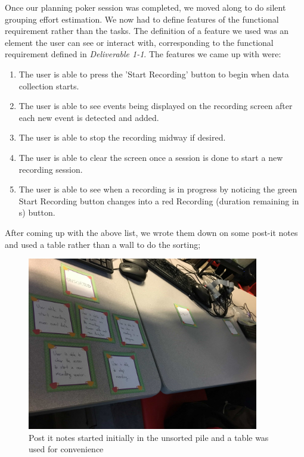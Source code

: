\documentclass[11pt,a4paper]{article}
\begin{document}
Once our planning poker session was completed, we moved along to do silent grouping effort estimation. We now had to define features of the functional requirement rather than the tasks. The definition of a feature we used was an element the user can see or interact with, corresponding to the functional requirement defined in \textit{Deliverable 1-1}. The features we came up with were:

\begin{enumerate}

\item The user is able to press the 'Start Recording' button to begin when data collection starts.
\item The user is able to see events being displayed on the recording screen after each new event is detected and added.
\item The user is able to stop the recording midway if desired.
\item The user is able to clear the screen once a session is done to start a new recording session.
\item The user is able to see when a recording is in progress by noticing the green Start Recording button changes into a red Recording (duration remaining in s) button.
\end{enumerate}

After coming up with the above list, we wrote them down on some post-it notes and used a table rather than a wall to do the sorting;

\begin{figure}[h]
\centering
	\includegraphics[width=0.9\textwidth]{silentimg1.png}
	\caption{Post it notes started initially in the unsorted pile and a table was used for convenience}
\end{figure}
\end{document}
